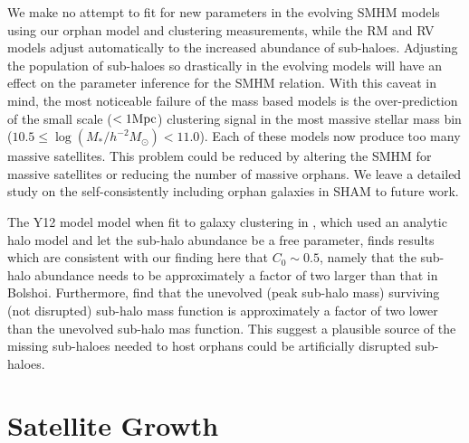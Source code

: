 \documentclass[a4paper,fleqn,usenatbib]{mnras}
\begin{document}
We make no attempt to fit for new parameters in the evolving SMHM models using our orphan model and clustering measurements, while the RM and RV models adjust automatically to the increased abundance of sub-haloes.  Adjusting the population of sub-haloes so drastically in the evolving models will have an effect on the parameter inference for the SMHM relation.  With this caveat in mind, the most noticeable failure of the mass based models is the over-prediction of the small scale ($< 1 {\rm Mpc}$) clustering signal in the most massive stellar mass bin ($10.5\leq \log(M_*/h^{-2}M_{\odot})<11.0$).  Each of these models now produce too many massive satellites.  This problem could be reduced by altering the SMHM for massive satellites or reducing the number of massive orphans.  We leave a detailed study on the self-consistently including orphan galaxies in SHAM to future work.

The Y12 model model when fit to galaxy clustering in \cite{Yang:2012ew}, which used an analytic halo model and let the sub-halo abundance be a free parameter, finds results which are consistent with our finding here that $C_0 \sim 0.5$, namely that the sub-halo abundance needs to be approximately a factor of two larger than that in Bolshoi.  Furthermore, \cite{Jiang:2016dw} find that the unevolved (peak sub-halo mass) surviving (not disrupted) sub-halo mass function is approximately a factor of two lower than the unevolved sub-halo mas function.  This suggest a plausible source of the missing sub-haloes needed to host orphans could be artificially disrupted sub-haloes.


\section{Satellite Growth}
\label{sec:sat_growth}  
\end{document}

